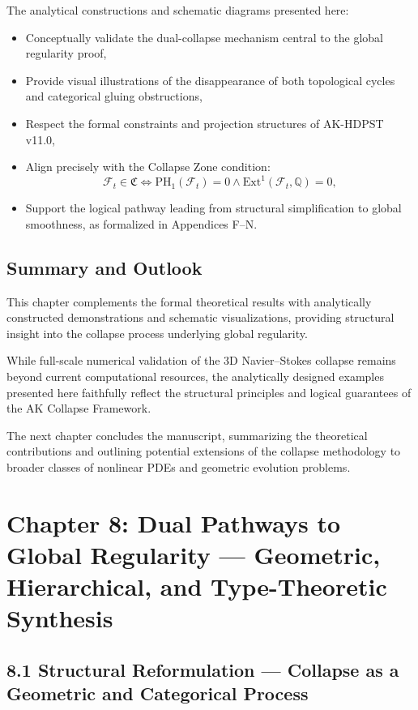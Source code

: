 \documentclass[11pt]{article}
\begin{document}
The analytical constructions and schematic diagrams presented here:

\begin{itemize}
  \item Conceptually validate the dual-collapse mechanism central to the global regularity proof,
  \item Provide visual illustrations of the disappearance of both topological cycles and categorical gluing obstructions,
  \item Respect the formal constraints and projection structures of AK-HDPST v11.0,
  \item Align precisely with the Collapse Zone condition:
  \[
  \mathcal{F}_t \in \mathfrak{C} \iff \mathrm{PH}_1(\mathcal{F}_t) = 0 \land \mathrm{Ext}^1(\mathcal{F}_t, \mathbb{Q}) = 0,
  \]
  \item Support the logical pathway leading from structural simplification to global smoothness, as formalized in Appendices F–N.
\end{itemize}

\subsection{Summary and Outlook}

This chapter complements the formal theoretical results with analytically constructed demonstrations and schematic visualizations, providing structural insight into the collapse process underlying global regularity.

While full-scale numerical validation of the 3D Navier–Stokes collapse remains beyond current computational resources, the analytically designed examples presented here faithfully reflect the structural principles and logical guarantees of the AK Collapse Framework.

The next chapter concludes the manuscript, summarizing the theoretical contributions and outlining potential extensions of the collapse methodology to broader classes of nonlinear PDEs and geometric evolution problems.



\section{Chapter 8: Dual Pathways to Global Regularity --- Geometric, Hierarchical, and Type-Theoretic Synthesis}

\subsection{8.1 Structural Reformulation --- Collapse as a Geometric and Categorical Process}
\end{document}
